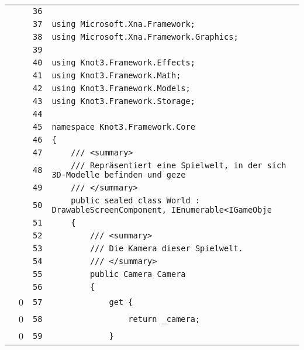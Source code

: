 \documentclass[a4paper,10pt]{article}
\begin{document}
\begin{longtable}[l]{lrrl}
\cellcolor{gray} &  & \verb~36~ & \verb~~\\
\cellcolor{gray} &  & \verb~37~ & \verb~using Microsoft.Xna.Framework;~\\
\cellcolor{gray} &  & \verb~38~ & \verb~using Microsoft.Xna.Framework.Graphics;~\\
\cellcolor{gray} &  & \verb~39~ & \verb~~\\
\cellcolor{gray} &  & \verb~40~ & \verb~using Knot3.Framework.Effects;~\\
\cellcolor{gray} &  & \verb~41~ & \verb~using Knot3.Framework.Math;~\\
\cellcolor{gray} &  & \verb~42~ & \verb~using Knot3.Framework.Models;~\\
\cellcolor{gray} &  & \verb~43~ & \verb~using Knot3.Framework.Storage;~\\
\cellcolor{gray} &  & \verb~44~ & \verb~~\\
\cellcolor{gray} &  & \verb~45~ & \verb~namespace Knot3.Framework.Core~\\
\cellcolor{gray} &  & \verb~46~ & \verb~{~\\
\cellcolor{gray} &  & \verb~47~ & \verb~    /// <summary>~\\
\cellcolor{gray} &  & \verb~48~ & \verb~    /// Repräsentiert eine Spielwelt, in der sich 3D-Modelle befinden und geze~\\
\cellcolor{gray} &  & \verb~49~ & \verb~    /// </summary>~\\
\cellcolor{gray} &  & \verb~50~ & \verb~    public sealed class World : DrawableScreenComponent, IEnumerable<IGameObje~\\
\cellcolor{gray} &  & \verb~51~ & \verb~    {~\\
\cellcolor{gray} &  & \verb~52~ & \verb~        /// <summary>~\\
\cellcolor{gray} &  & \verb~53~ & \verb~        /// Die Kamera dieser Spielwelt.~\\
\cellcolor{gray} &  & \verb~54~ & \verb~        /// </summary>~\\
\cellcolor{gray} &  & \verb~55~ & \verb~        public Camera Camera~\\
\cellcolor{gray} &  & \verb~56~ & \verb~        {~\\
\cellcolor{red} & 0 & \verb~57~ & \verb~            get {~\\
\cellcolor{red} & 0 & \verb~58~ & \verb~                return _camera;~\\
\cellcolor{red} & 0 & \verb~59~ & \verb~            }~\\

\end{longtable}
\end{document}
